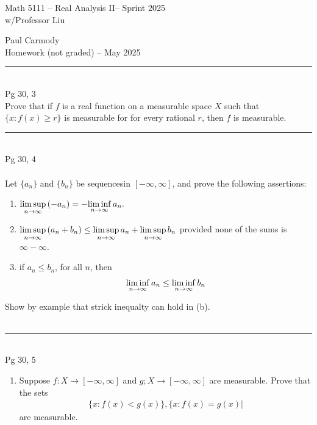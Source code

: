 \documentclass[10pt,a4paper]{report}
\newcommand{\CLASSNAME}{Math 5111 -- Real Analysis II}
\newcommand{\STUDENTNAME}{Paul Carmody}
\newcommand{\ASSIGNMENT}{Homework (not graded) }
\newcommand{\DUEDATE}{May 2025}
\newcommand{\SEMESTER}{Sprint 2025}
\newcommand{\HLINE}{\noindent\rule{7in}{1pt}\\}
\begin{document}
\begin{center}
	\Large{\CLASSNAME -- \SEMESTER} \\
	\large{ w/Professor Liu}
\end{center}
\begin{center}
	\STUDENTNAME \\
	\ASSIGNMENT -- \DUEDATE\\
\end{center} 

\HLINE
\noindent Pg 30, 3\\

\noindent Prove that if $f$ is a real function on a measurable space $X$ such that $\{x:f(x) \ge r\}$ is measurable for for every rational $r$, then $f$ is measurable. \\

\HLINE
\noindent Pg 30, 4\\ \\
Let $\{a_n\}$ and $\{b_n\}$ be sequencesin $[-\infty,\infty]$, and prove the following assertions:
\begin{enumerate}[label=(\alph*)]
	\item $ \underset{n\to\infty}\limsup \, (-a_n) = - \underset{n\to\infty}\liminf \, a_n. $
	
	\item $ \underset{n\to\infty}\limsup \, (a_n+b_n) \le \underset{n\to\infty}\limsup \, a_n + \underset{n\to\infty}\limsup \, b_n$ provided none of the sums is $\infty - \infty$.
	
	\item if $a_n \le b_n$, for all $n$, then 
	\begin{align*}
		\underset{n\to\infty}\liminf \, a_n \le \underset{n\to\infty}\liminf \, b_n
	\end{align*}
\end{enumerate}Show by example that strick inequalty can hold in (b).\\ \\
\HLINE
\noindent Pg 30, 5\\
\begin{enumerate}[label=(\alph*)]
	\item Suppose $f: X \to [-\infty, \infty]$ and $g; X \to [-\infty,\infty ]$ are measurable.  Prove that the sets 
	\begin{align*}
		\{x:f(x) < g(x)\}, \{x:f(x)=g(x)|
	\end{align*}are measurable.
	
\end{enumerate}
\end{document}
